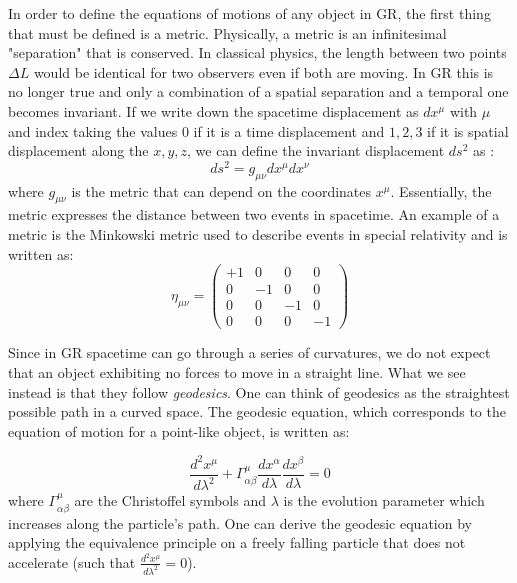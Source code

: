 In order to define the equations of motions of any object in GR, the first thing that must be defined is a metric. Physically, a metric is an infinitesimal "separation" that is 
conserved. In classical physics, the length between two points $\Delta L$ would be identical for two observers even if both are moving. In GR this is no longer true and only a 
combination of a spatial separation and a temporal one becomes invariant. If we write down the spacetime displacement as $dx^{\mu}$ with $\mu$ and index taking the values $0$ 
if it is a time displacement and ${1, 2, 3}$ if it is spatial displacement along the $x, y, z$, we can define the invariant displacement $ds^2$ as :
\begin{equation}
    ds^2 = g_{\mu \nu} dx^{\mu} dx^{\nu}
\end{equation}
where $g_{\mu \nu}$ is the metric that can depend on the coordinates $x^{\mu}$. Essentially, the metric expresses the distance between two events in spacetime. An example of a 
metric is the Minkowski metric used to describe events in special relativity and is written as:
\begin{equation}
    \eta_{\mu \nu} =
    \begin{pmatrix}
        +1 & 0 & 0 & 0 \\
        0 & -1 & 0 & 0 \\
        0 & 0 & -1 & 0 \\
        0 & 0 & 0 & -1
    \end{pmatrix}
\end{equation}

Since in GR spacetime can go through a series of curvatures, we do not expect that an object exhibiting no forces to move in a straight line. What we see instead is that 
they follow \textit{geodesics}. One can think of geodesics as the straightest possible path in a curved space. 
The geodesic equation, which corresponds to the equation of motion for a point-like object, is written as:

\begin{equation}
    \frac{d^2 x^{\mu}}{d\lambda^2} + \Gamma^{\mu}_{\alpha \beta} 
    \frac{dx^{\alpha}}{d\lambda} \frac{dx^{\beta}}{d\lambda} = 0
\end{equation}
where $\Gamma^{\mu}_{\alpha \beta}$ are the Christoffel symbols and $\lambda$ is the evolution parameter which increases along the particle's path. 
One can derive the geodesic equation by applying the equivalence principle on a freely falling particle
that does not accelerate (such that $\frac{d^2 x^{\mu}}{d\lambda^2} = 0$). \\

